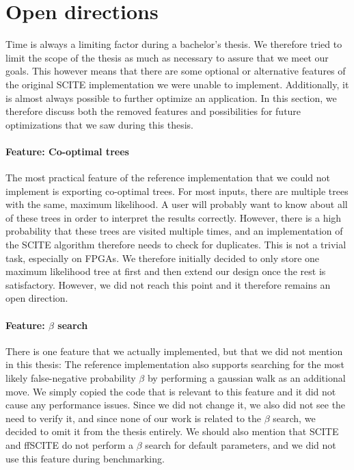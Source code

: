 \section{Open directions}
\label{sec:open_directions}

Time is always a limiting factor during a bachelor's thesis. We therefore tried to limit the scope of the thesis as much as necessary to assure that we meet our goals. This however means that there are some optional or alternative features of the original \ac{SCITE} implementation we were unable to implement. Additionally, it is almost always possible to further optimize an application. In this section, we therefore discuss both the removed features and possibilities for future optimizations that we saw during this thesis.

\paragraph{Feature: Co-optimal trees}
The most practical feature of the reference implementation that we could not implement is exporting co-optimal trees. For most inputs, there are multiple trees with the same, maximum likelihood. A user will probably want to know about all of these trees in order to interpret the results correctly. However, there is a high probability that these trees are visited multiple times, and an implementation of the \ac{SCITE} algorithm therefore needs to check for duplicates. This is not a trivial task, especially on \acp{FPGA}. We therefore initially decided to only store one maximum likelihood tree at first and then extend our design once the rest is satisfactory. However, we did not reach this point and it therefore remains an open direction.

\paragraph{Feature: $\beta$ search}
There is one feature that we actually implemented, but that we did not mention in this thesis: The reference implementation also supports searching for the most likely false-negative probability $\beta$ by performing a gaussian walk as an additional move. We simply copied the code that is relevant to this feature and it did not cause any performance issues. Since we did not change it, we also did not see the need to verify it, and since none of our work is related to the $\beta$ search, we decided to omit it from the thesis entirely. We should also mention that \ac{SCITE} and \ac{ffSCITE} do not perform a $\beta$ search for default parameters, and we did not use this feature during benchmarking.

